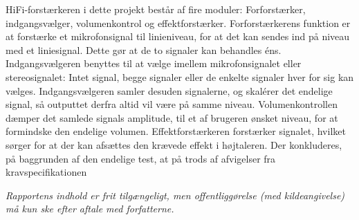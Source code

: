 \begin{multicols}{2}
{\begin{minipage}{2.8in}
HiFi-forstærkeren i dette projekt består af fire moduler: Forforstærker, indgangsvælger, volumenkontrol og effektforstærker. Forforstærkerens funktion er at forstærke et mikrofonsignal til linieniveau, for at det kan sendes ind på niveau med et liniesignal. Dette gør at de to signaler kan behandles éns.
Indgangsvælgeren benyttes til at vælge imellem mikrofonsignalet eller stereosignalet: Intet signal, begge signaler eller de enkelte signaler hver for sig kan vælges. Indgangsvælgeren samler desuden signalerne, og skalérer det endelige signal, så outputtet derfra altid vil være på samme niveau.
Volumenkontrollen dæmper det samlede signals amplitude, til et af brugeren ønsket niveau, for at formindske den endelige volumen.
Effektforstærkeren forstærker signalet, hvilket sørger for at der kan afsættes den krævede effekt i højtaleren.
Der konkluderes, på baggrunden af den endelige test, at på trods af afvigelser fra kravspecifikationen 
\end{minipage}}
\newline
\end{multicols}

\textit{\scriptsize{Rapportens indhold er frit tilgængeligt, men offentliggørelse (med kildeangivelse) må kun ske efter aftale med forfatterne.}}